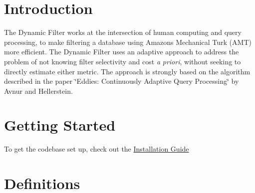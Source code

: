 \hypertarget{index_intro}{}\section{Introduction}\label{index_intro}
The Dynamic Filter works at the intersection of human computing and query processing, to make filtering a database using Amazon\textquotesingle{}s Mechanical Turk (A\+MT) more efficient. The Dynamic Filter uses an adaptive approach to address the problem of not knowing filter selectivity and cost {\itshape a} {\itshape priori}, without seeking to directly estimate either metric. The approach is strongly based on the algorithm described in the paper \char`\"{}\+Eddies\+: Continuously Adaptive Query Processing\char`\"{} by Avnur and Hellerstein.\hypertarget{index_gettingstarted}{}\section{Getting Started}\label{index_gettingstarted}
To get the codebase set up, check out the \hyperlink{install_info}{Installation Guide}\hypertarget{index_defs}{}\section{Definitions}\label{index_defs}


